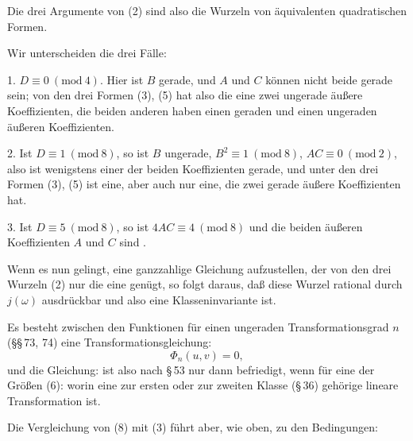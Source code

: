 Die drei Argumente von (2) sind also die Wurzeln von \"aquivalenten quadratischen Formen.

Wir unterscheiden die drei F\"alle:

1. $D\equiv 0\ (\mathrm{mod}\ 4)$. Hier ist $B$ gerade, und $A$ und $C$ k\"onnen nicht beide gerade sein; von den drei Formen (3), (5) hat also die eine zwei ungerade \"au{\ss}ere Koeffizienten, die beiden anderen haben einen geraden und einen ungeraden \"au{\ss}eren Koeffizienten.

2. Ist $D\equiv 1\ (\mathrm{mod}\ 8)$, so ist $B$ ungerade, $B^2\equiv 1\ (\mathrm{mod}\ 8)$, $AC\equiv 0\ (\mathrm{mod}\ 2)$, also ist wenigstens einer der beiden Koeffizienten gerade, und unter den drei Formen (3), (5) ist eine, aber auch nur eine, die zwei gerade \"au{\ss}ere Koeffizienten hat.

3. Ist $D\equiv 5\ (\mathrm{mod}\ 8)$, so ist $4AC\equiv 4\ (\mathrm{mod}\ 8)$ und die beiden \"au{\ss}eren Koeffizienten $A$ und $C$ sind .

Wenn es nun gelingt, eine ganzzahlige Gleichung aufzustellen, der von den drei Wurzeln (2) nur die eine gen\"ugt, so folgt daraus, da{\ss} diese  Wurzel rational durch $j(\omega)$ ausdr\"uckbar und also eine Klasseninvariante ist.

Es besteht zwischen den Funktionen
f\"ur einen ungeraden Transformationsgrad $n$ (\S\S\,73, 74) eine Transformationsgleichung:
\[
\Phi_n(u,v) = 0,
\]
und die Gleichung:
ist also nach \S\,53 nur dann befriedigt, wenn f\"ur eine der Gr\"o{\ss}en (6):
worin
eine zur ersten oder zur zweiten Klasse (\S\,36) geh\"orige lineare Transformation ist.

Die Vergleichung von (8) mit (3) f\"uhrt aber, wie oben, zu den Bedingungen:

